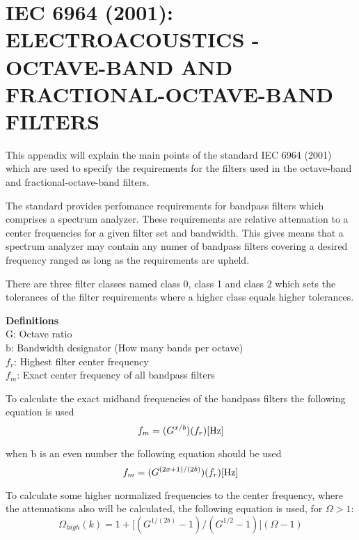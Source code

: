 \chapter{IEC 6964 (2001): ELECTROACOUSTICS - OCTAVE-BAND AND FRACTIONAL-OCTAVE-BAND FILTERS} \label{app:IEC6964}
This appendix will explain the main points of the standard IEC 6964 (2001) which are used to specify the requirements for the filters used in the octave-band and fractional-octave-band filters.

The standard provides perfomance requirements for bandpass filters which comprises a spectrum analyzer. These requirements are relative attenuation to a center frequencies for a given filter set and bandwidth. This gives means that a spectrum analyzer may contain any numer of bandpass filters covering a desired frequency ranged as long as the requirements are upheld. 

There are three filter classes named class 0, class 1 and class 2 which sets the tolerances of the filter requirements where a higher class equals higher tolerances.  

\textbf{Definitions} \\
G: Octave ratio \\
b: Bandwidth designator (How many bands per octave) \\
$f_r$: Highest filter center frequency \\
$f_m$: Exact center frequency of all bandpass filters

To calculate the exact midband frequencies of the bandpass filters the following equation is used
\begin{equation}
f_m=(G^{x/b})(f_r) \enhed{Hz}
\end{equation}
\begin{where}
\end{where}

when b is an even number the following equation should be used
\begin{equation}
f_m=(G^{(2x+1)/(2b)})(f_r) \enhed{Hz}
\end{equation}

To calculate some higher normalized frequencies to the center frequency,  where the attenuations also will be calculated, the following equation is used, for $\Omega > 1$:
\begin{equation}
\Omega_{high}(k) = 1+\Big[(G^{1/(2b)}-1)/(G^{1/2}-1)\Big](\Omega-1)
\end{equation}
\begin{where}
\end{where}

